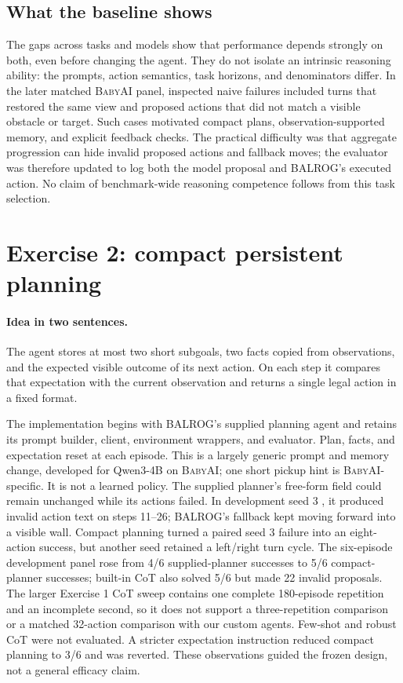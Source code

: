 \documentclass[11pt,a4paper]{article}
\newcommand{\BabyAI}{\textsc{BabyAI}}
\begin{document}
\subsection{What the baseline shows}

The gaps across tasks and models show that performance depends strongly on both, even before changing the agent. They do not isolate an intrinsic reasoning ability: the prompts, action semantics, task horizons, and denominators differ. In the later matched \BabyAI{} panel, inspected naive failures included turns that restored the same view and proposed actions that did not match a visible obstacle or target. Such cases motivated compact plans, observation-supported memory, and explicit feedback checks. The practical difficulty was that aggregate progression can hide invalid proposed actions and fallback moves; the evaluator was therefore updated to log both the model proposal and BALROG's executed action. No claim of benchmark-wide reasoning competence follows from this task selection.

\section{Exercise 2: compact persistent planning}

\paragraph{Idea in two sentences.} The agent stores at most two short subgoals, two facts copied from observations, and the expected visible outcome of its next action. On each step it compares that expectation with the current observation and returns a single legal action in a fixed  format.

The implementation begins with BALROG's supplied  planning agent and retains its prompt builder, client, environment wrappers, and evaluator. Plan, facts, and expectation reset at each episode. This is a largely generic prompt and memory change, developed for Qwen3-4B on \BabyAI{}; one short pickup hint is \BabyAI{}-specific. It is not a learned policy. The supplied planner's free-form  field could remain unchanged while its actions failed. In development seed 3 , it produced invalid action text on steps 11--26; BALROG's fallback kept moving forward into a visible wall. Compact planning turned a paired seed 3  failure into an eight-action success, but another seed retained a left/right turn cycle. The six-episode development panel rose from 4/6 supplied-planner successes to 5/6 compact-planner successes; built-in CoT also solved 5/6 but made 22 invalid proposals. The larger Exercise 1 CoT sweep contains one complete 180-episode repetition and an incomplete second, so it does not support a three-repetition comparison or a matched 32-action comparison with our custom agents. Few-shot and robust CoT were not evaluated. A stricter expectation instruction reduced compact planning to 3/6 and was reverted. These observations guided the frozen design, not a general efficacy claim.
\end{document}
